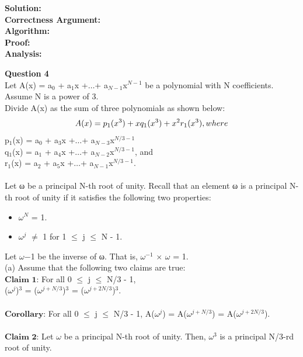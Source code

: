 \documentclass[11pt]{article}
\begin{document}
\textbf{Solution:}\\
\textbf{Correctness Argument:}\\
\textbf{Algorithm:}\\
\textbf{Proof:}\\
\textbf{Analysis:}\\
\clearpage





\textbf{Question 4}\\
 Let A(x) = a$_0$ + a$_{1}$x +$\dots$+ a$_{N-1}$x$^{N-1}$ be a polynomial with N coefficients. Assume N is a power of 3.\\ 
Divide A(x) as the sum of three polynomials as shown below:\\
\begin{equation}
A(x) = p_1(x^3) + xq_1(x^3) + x^2r_1(x^3), where\\
\end{equation}
p$_1$(x) = a$_0$ + a$_{3}$x +$\dots$+ a$_{N-3}$x$^{N/3-1}$\\
q$_1$(x) = a$_1$ + a$_{4}$x +$\dots$+ a$_{N-2}$x$^{N/3-1}$, and\\
r$_1$(x) = a$_2$ + a$_{5}$x +$\dots$+ a$_{N-1}$x$^{N/3-1}$.\\ \\
Let ω be a principal N-th root of unity. Recall that an element ω is a principal N-th root of unity if
it satisfies the following two properties:
\begin{itemize}
\item $\omega$$^N$ = 1.
\item $\omega$$^j$ $\neq$ 1 for 1 $\leq$ j $\leq$ N - 1.
\end{itemize}
Let $\omega$−1 be the inverse of ω. That is, $\omega$$^{-1}$ $\times$ $\omega$ = 1.\\ 
(a) Assume that the following two claims are true:\\
$\textbf{Claim 1:}$ For all 0 $\leq$ j $\leq$ N/3 - 1,\\
($\omega$$^j$)$^3$ = ($\omega$$^{j + N/3}$)$^3$ = ($\omega$$^{j + 2N/3}$)$^3$.\\ \\
$\textbf{Corollary:}$ For all 0 $\leq$ j $\leq$ N/3 - 1, A($\omega$$^j$) = A($\omega$$^{j+N/3}$) = A($\omega$$^{j+2N/3}$).\\ \\
$\textbf{Claim 2:}$ Let $\omega$ be a principal N-th root of unity. Then, $\omega$$^3$
is a principal N/3-rd root of unity.\\ \\
\end{document}
